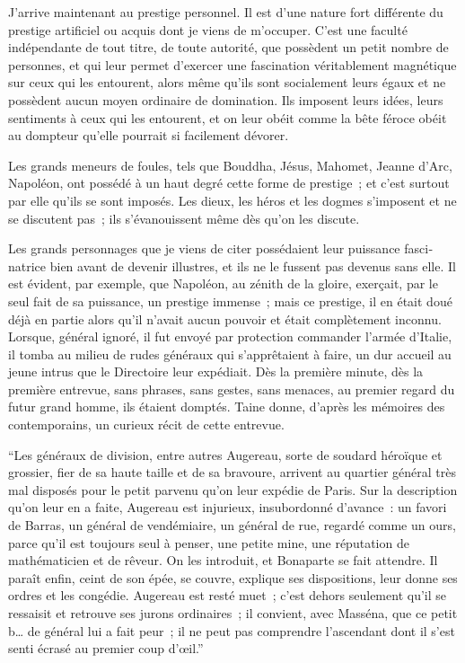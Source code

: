 \documentclass[french,twoside]{book} %
\begin{document}
J’arrive maintenant au prestige personnel. Il est d’une nature fort différente du prestige artificiel ou acquis dont je viens de m’occuper. C’est une faculté indépendante de tout titre, de toute autorité, que possèdent un petit nombre de personnes, et qui leur permet d’exercer une fascination véritablement magnétique sur ceux qui les entourent, alors même qu’ils sont socialement leurs égaux et ne possèdent aucun moyen ordi­naire de domination. Ils imposent leurs idées, leurs sentiments à ceux qui les entourent, et on leur obéit comme la bête féroce obéit au dompteur qu’elle pourrait si facilement dévorer.\par
Les grands meneurs de foules, tels que Bouddha, Jésus, Mahomet, Jeanne d’Arc, Napoléon, ont possédé à un haut degré cette forme de prestige ; et c’est surtout par elle qu’ils se sont imposés. Les dieux, les héros et les dogmes s’imposent et ne se discutent pas ; ils s’évanouissent même dès qu’on les discute.\par
Les grands personnages que je viens de citer possédaient leur puissance fasci­natrice bien avant de devenir illustres, et ils ne le fussent pas devenus sans elle. Il est évident, par exemple, que Napoléon, au zénith de la gloire, exerçait, par le seul fait de sa puissance, un prestige immense ; mais ce prestige, il en était doué déjà en partie alors qu’il n’avait aucun pouvoir et était complète­ment inconnu. Lorsque, général ignoré, il fut envoyé par protection commander l’armée d’Italie, il tomba au milieu de rudes généraux qui s’apprêtaient à faire, un dur accueil au jeune intrus que le Directoire leur expédiait. Dès la première minute, dès la première entrevue, sans phrases, sans gestes, sans menaces, au premier regard du futur grand homme, ils étaient domptés. Taine donne, d’après les mémoires des contemporains, un curieux récit de cette entrevue.\par
“Les généraux de division, entre autres Augereau, sorte de soudard héroïque et grossier, fier de sa haute taille et de sa bravoure, arrivent au quartier général très mal disposés pour le petit parvenu qu’on leur expédie de Paris. Sur la description qu’on leur en a faite, Augereau est injurieux, insubordonné d’avance : un favori de Barras, un général de vendémiaire, un général de rue, regardé comme un ours, parce qu’il est toujours seul à penser, une petite mine, une réputation de mathématicien et de rêveur. On les introduit, et Bonaparte se fait attendre. Il paraît enfin, ceint de son épée, se couvre, explique ses dispositions, leur donne ses ordres et les congédie. Augereau est resté muet ; c’est dehors seulement qu’il se ressaisit et retrouve ses jurons ordinaires ; il convient, avec Masséna, que ce petit b… de général lui a fait peur ; il ne peut pas comprendre l’ascendant dont il s’est senti écrasé au premier coup d’œil.”\par
\end{document}
